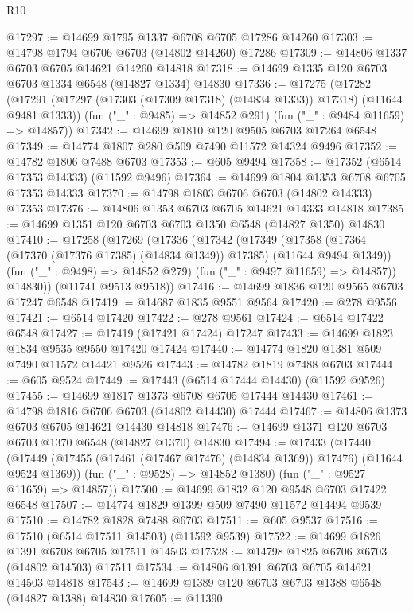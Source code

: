 \begin{lexlean}{R10}
\begin{coremodule}
@17297 := @14699 @1795 @1337 @6708 @6705 @17286 @14260
@17303 := @14798 @1794 @6706 @6703 (@14802 @14260) @17286
@17309 := @14806 @1337 @6703 @6705 @14621 @14260 @14818
@17318 := @14699 @1335 @120 @6703 @6703 @1334 @6548 (@14827 @1334) @14830
@17336 := @17275
    (@17282
      (@17291 (@17297 (@17303 (@17309 @17318) (@14834 @1333)) @17318) (@11644 @9481 @1333))
      (fun ("_" : @9485) => @14852 @291)
      (fun ("_" : @9484 @11659) => @14857))
@17342 := @14699 @1810 @120 @9505 @6703 @17264 @6548
@17349 := @14774 @1807 @280 @509 @7490 @11572 @14324 @9496
@17352 := @14782 @1806 @7488 @6703
@17353 := @605 @9494
@17358 := @17352 (@6514 @17353 @14333) (@11592 @9496)
@17364 := @14699 @1804 @1353 @6708 @6705 @17353 @14333
@17370 := @14798 @1803 @6706 @6703 (@14802 @14333) @17353
@17376 := @14806 @1353 @6703 @6705 @14621 @14333 @14818
@17385 := @14699 @1351 @120 @6703 @6703 @1350 @6548 (@14827 @1350) @14830
@17410 := @17258
    (@17269
      (@17336
        (@17342
          (@17349
            (@17358 (@17364 (@17370 (@17376 @17385) (@14834 @1349)) @17385) (@11644 @9494 @1349))
            (fun ("_" : @9498) => @14852 @279)
            (fun ("_" : @9497 @11659) => @14857))
          @14830))
      (@11741 @9513 @9518))
@17416 := @14699 @1836 @120 @9565 @6703 @17247 @6548
@17419 := @14687 @1835 @9551 @9564
@17420 := @278 @9556
@17421 := @6514 @17420
@17422 := @278 @9561
@17424 := @6514 @17422 @6548
@17427 := @17419 (@17421 @17424) @17247
@17433 := @14699 @1823 @1834 @9535 @9550 @17420 @17424
@17440 := @14774 @1820 @1381 @509 @7490 @11572 @14421 @9526
@17443 := @14782 @1819 @7488 @6703
@17444 := @605 @9524
@17449 := @17443 (@6514 @17444 @14430) (@11592 @9526)
@17455 := @14699 @1817 @1373 @6708 @6705 @17444 @14430
@17461 := @14798 @1816 @6706 @6703 (@14802 @14430) @17444
@17467 := @14806 @1373 @6703 @6705 @14621 @14430 @14818
@17476 := @14699 @1371 @120 @6703 @6703 @1370 @6548 (@14827 @1370) @14830
@17494 := @17433
    (@17440
      (@17449 (@17455 (@17461 (@17467 @17476) (@14834 @1369)) @17476) (@11644 @9524 @1369))
      (fun ("_" : @9528) => @14852 @1380)
      (fun ("_" : @9527 @11659) => @14857))
@17500 := @14699 @1832 @120 @9548 @6703 @17422 @6548
@17507 := @14774 @1829 @1399 @509 @7490 @11572 @14494 @9539
@17510 := @14782 @1828 @7488 @6703
@17511 := @605 @9537
@17516 := @17510 (@6514 @17511 @14503) (@11592 @9539)
@17522 := @14699 @1826 @1391 @6708 @6705 @17511 @14503
@17528 := @14798 @1825 @6706 @6703 (@14802 @14503) @17511
@17534 := @14806 @1391 @6703 @6705 @14621 @14503 @14818
@17543 := @14699 @1389 @120 @6703 @6703 @1388 @6548 (@14827 @1388) @14830
@17605 := @11390

\end{coremodule}
\end{lexlean}
